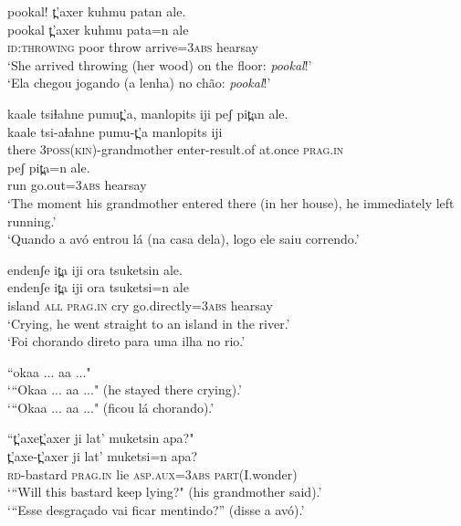 \documentclass[output=paper,
modfonts,nonflat
]{langsci/langscibook}
\begin{document}
\ea pookal! t̪'axer kuhmu patan ale.\\[.3em]
\gll pookal   t̪'axer  kuhmu  pata=n  ale\\
\textsc{id:throwing}  poor throw arrive=\textsc{3abs} hearsay\\
\glt `She arrived throwing (her wood) on the floor: \textit{pookal}!'\\
‘Ela chegou jogando (a lenha) no chão: \textit{pookal}!’
\z

\ea kaale tsiɬahne pumut̪'a, manlopits iji peʃ pit̪an ale.\\[.3em]
\gll kaale tsi-aɬahne pumu-t̪'a manlopits iji\\
there  \textsc{3poss(kin)}-grandmother  enter-result.of  at.once     \textsc{prag.in}\\



\gll peʃ pit̪a=n ale.\\
run go.out=\textsc{3abs}  hearsay\\

\glt `The moment his grandmother entered there (in her house), he immediately left running.'\\
‘Quando a avó entrou lá (na casa dela), logo ele saiu correndo.’
\z

\ea endenʃe it̪a iji ora tsuketsin ale.\\[.3em]
\gll endenʃe it̪a iji  ora  tsuketsi=n  ale\\
island \textsc{all}  \textsc{prag.in}  cry  go.directly=\textsc{3abs} hearsay\\
\glt `Crying, he went straight to an island in the river.'\\
‘Foi chorando direto para uma ilha no rio.’
\z

\ea “okaa ... aa ..."\\[.3em]
\glt ‘“Okaa ... aa ..." (he stayed there crying).'\\
‘“Okaa ... aa ..." (ficou lá chorando).'
\z

\ea “t̪'axet̪'axer ji lat' muketsin apa?"\\[.3em]
\gll t̪'axe-t̪'axer ji lat' muketsi=n  apa?\\
\textsc{rd}-bastard  \textsc{prag.in}  lie   \textsc{asp.aux}=\textsc{3abs}  \textsc{part}(I.wonder)\\
\glt ‘“Will this bastard keep lying?" (his grandmother said).'\\
‘“Esse desgraçado vai ficar mentindo?” (disse a avó).'{\footnotemark}

\z
\end{document}

